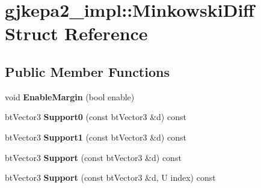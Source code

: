 \hypertarget{structgjkepa2__impl_1_1MinkowskiDiff}{}\section{gjkepa2\+\_\+impl\+:\+:Minkowski\+Diff Struct Reference}
\label{structgjkepa2__impl_1_1MinkowskiDiff}
\subsection*{Public Member Functions}
\begin{DoxyCompactItemize}
\item 
\mbox{\label{structgjkepa2__impl_1_1MinkowskiDiff_a2050c7ca5d9c033d40da2a95ed7efc9d}} 
void {\bfseries Enable\+Margin} (bool enable)
\item 
\mbox{\label{structgjkepa2__impl_1_1MinkowskiDiff_a0997cc778a6d8bd9a970f32c99322d5c}} 
bt\+Vector3 {\bfseries Support0} (const bt\+Vector3 \&d) const
\item 
\mbox{\label{structgjkepa2__impl_1_1MinkowskiDiff_a53eb7ee0bcb7921dbcf1cd4bf9da3698}} 
bt\+Vector3 {\bfseries Support1} (const bt\+Vector3 \&d) const
\item 
\mbox{\label{structgjkepa2__impl_1_1MinkowskiDiff_af1ffc09a86f6e438b573dfba8fef0601}} 
bt\+Vector3 {\bfseries Support} (const bt\+Vector3 \&d) const
\item 
\mbox{\label{structgjkepa2__impl_1_1MinkowskiDiff_a748b874d4831eb6fdb21b4a45feb3f00}} 
bt\+Vector3 {\bfseries Support} (const bt\+Vector3 \&d, U index) const
\end{DoxyCompactItemize}

